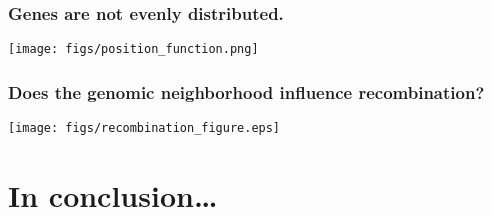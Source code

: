 \begin{frame}
	\frametitle{Genes are not evenly distributed.}
	\centerline{\texttt{[image: figs/position\_function.png]}}
\end{frame}

\begin{frame}
	\frametitle{Does the genomic neighborhood influence recombination?}
	\centerline{\texttt{[image: figs/recombination\_figure.eps]}}
\end{frame}

\section{In conclusion\ldots}

